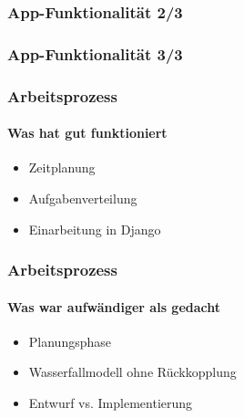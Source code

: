 \documentclass{beamer}
\begin{document}
\begin{frame}
\frametitle{App-Funktionalität 2/3}
\begin{center}

\end{center}\end{frame}
\begin{frame}
\frametitle{App-Funktionalität 3/3}
\begin{center}

\end{center}\end{frame}
\begin{frame}
\frametitle{Arbeitsprozess}
\framesubtitle{Was hat gut funktioniert}
\begin{itemize}
	\item<1-3> Zeitplanung
	\item<2-3> Aufgabenverteilung
	\item<3> Einarbeitung in Django
\end{itemize}
\end{frame}

\begin{frame}
\frametitle{Arbeitsprozess}
\framesubtitle{Was war aufwändiger als gedacht}
\begin{itemize}
	\item<1-3> Planungsphase
	\item<2-3> Wasserfallmodell ohne Rückkopplung
	\item<3> Entwurf vs. Implementierung
\end{itemize}
\end{frame}
\end{document}
